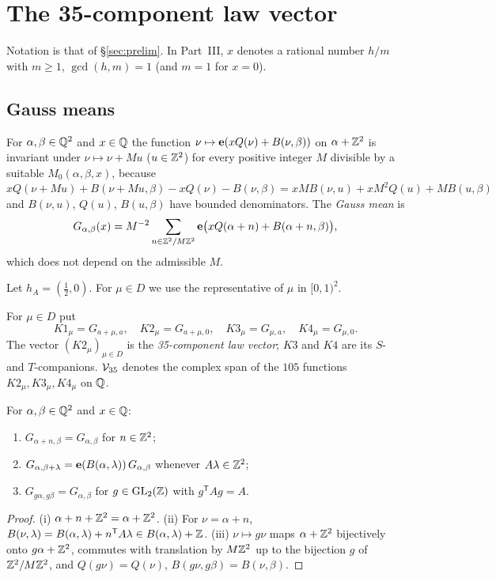 \section{The 35-component law vector}\label{sec:law35}
Notation is that of \S\ref{sec:prelim}. In Part~III, $x$ denotes a rational number $h/m$ with $m\ge1$, $\gcd(h,m)=1$ (and $m=1$ for $x=0$).

\subsection{Gauss means}
\begin{definition}\label{def:gaussmean}
For $\alpha,\beta\in\mathbb{Q}^2$ and $x\in\mathbb{Q}$ the function $\nu\mapsto\mathbf{e}(xQ(\nu)+B(\nu,\beta))$ on $\alpha+\mathbb{Z}^2$ is invariant under $\nu\mapsto\nu+Mu$
($u\in\mathbb{Z}^2$) for every positive integer $M$ divisible by a suitable $M_0(\alpha,\beta,x)$, because
$xQ(\nu+Mu)+B(\nu+Mu,\beta)-xQ(\nu)-B(\nu,\beta)=xMB(\nu,u)+xM^2Q(u)+MB(u,\beta)$ and $B(\nu,u)$, $Q(u)$, $B(u,\beta)$ have bounded denominators.
The \emph{Gauss mean} is
\[
G_{\alpha,\beta}(x)=M^{-2}\sum_{n\in\mathbb{Z}^2/M\mathbb{Z}^2}\mathbf{e}\bigl(xQ(\alpha+n)+B(\alpha+n,\beta)\bigr),
\]
which does not depend on the admissible $M$.
\end{definition}
Let $h_A=(\tfrac12,0)$. For $\mu\in D$ we use the representative of $\mu$ in $[0,1)^2$.
\begin{definition}\label{def:K}
For $\mu\in D$ put
\[
K1_\mu=G_{a+\mu,a},\quad K2_\mu=G_{a+\mu,0},\quad K3_\mu=G_{\mu,a},\quad K4_\mu=G_{\mu,0}.
\]
The vector $(K2_\mu)_{\mu\in D}$ is the \emph{35-component law vector}; $K3$ and $K4$ are its $S$- and $T$-companions. $\mathcal V_{35}$ denotes the
complex span of the $105$ functions $K2_\mu,K3_\mu,K4_\mu$ on $\mathbb{Q}$.
\end{definition}

\begin{lemma}\label{lem:rules}
For $\alpha,\beta\in\mathbb{Q}^2$ and $x\in\mathbb{Q}$:
\begin{enumerate}[label=(\roman*)]
\item $G_{\alpha+n,\beta}=G_{\alpha,\beta}$ for $n\in\mathbb{Z}^2$;
\item $G_{\alpha,\beta+\lambda}=\mathbf{e}(B(\alpha,\lambda))\,G_{\alpha,\beta}$ whenever $A\lambda\in\mathbb{Z}^2$;
\item $G_{g\alpha,g\beta}=G_{\alpha,\beta}$ for $g\in\mathrm{GL}_2(\mathbb{Z})$ with $g^{\mathsf T}Ag=A$.
\end{enumerate}
\end{lemma}
\begin{proof}
(i) $\alpha+n+\mathbb{Z}^2=\alpha+\mathbb{Z}^2$. (ii) For $\nu=\alpha+n$, $B(\nu,\lambda)=B(\alpha,\lambda)+n^{\mathsf T}A\lambda\in B(\alpha,\lambda)+\mathbb{Z}$.
(iii) $\nu\mapsto g\nu$ maps $\alpha+\mathbb{Z}^2$ bijectively onto $g\alpha+\mathbb{Z}^2$, commutes with translation by $M\mathbb{Z}^2$ up to the bijection $g$ of
$\mathbb{Z}^2/M\mathbb{Z}^2$, and $Q(g\nu)=Q(\nu)$, $B(g\nu,g\beta)=B(\nu,\beta)$.
\end{proof}

